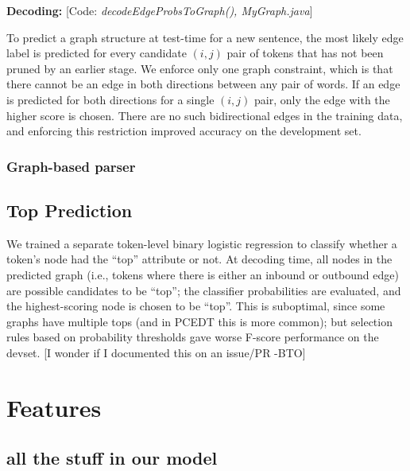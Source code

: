 \documentclass[11pt]{article}
\newcommand{\bocomment}[1]{\textcolor{Bittersweet}{[#1 -BTO]}}
\newcommand{\codenote}[1]{\textcolor{PineGreen}{[Code: \emph{#1}]}}
\newcommand{\noedge}{\textsc{NoEdge}}
\begin{document}
\textbf{Decoding:}
\codenote{decodeEdgeProbsToGraph(), MyGraph.java}

To predict a graph structure at test-time for a new sentence,
the most likely edge label is predicted for every candidate $(i, j)$ pair of
tokens that has not been pruned by an earlier stage.
We enforce only one graph constraint, which is that there cannot be
an edge in both directions between any pair of words.
If an edge is predicted for both directions for a single $(i, j)$
pair, only the edge with the higher score is chosen.
There are no such bidirectional edges in the training data, and enforcing this
restriction improved accuracy on the development set.%



\subsubsection{Graph-based parser} \label{s:graphparser}

\subsection{Top Prediction} \label{s:top_model}

We trained a separate token-level binary logistic regression to classify
whether a token's node had the ``top'' attribute or not.
At decoding time, all nodes in the predicted graph (i.e., tokens where there is
either an inbound or outbound edge) are possible candidates to be ``top'';
the classifier probabilities are evaluated, and the highest-scoring node is
chosen to be ``top''.
This is suboptimal, since some graphs have multiple tops (and in PCEDT this is
more common);
but selection rules based on probability thresholds gave worse F-score
performance on the devset. \bocomment{I wonder if I documented this on an issue/PR}

\section{Features}

\subsection{all the stuff in our model}
\end{document}
